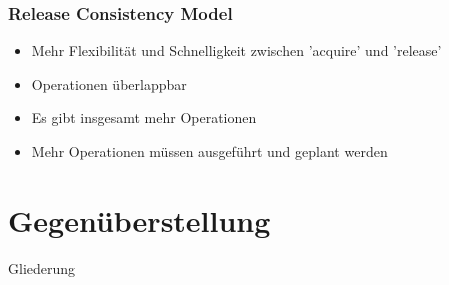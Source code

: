 \documentclass{sikslides}
\begin{document}
\begin{frame}
	\frametitle{Release Consistency Model}
	\begin{itemize}


		\item Mehr Flexibilität und Schnelligkeit zwischen ’acquire’ und ’release’ \bigskip
		\item Operationen überlappbar \bigskip
\end{itemize}
\begin{itemize}
		\item Es gibt insgesamt mehr Operationen  \bigskip
		\item Mehr Operationen müssen ausgeführt und geplant werden 

		

	\end{itemize}


\end{frame}



\section{Gegenüberstellung}
\begin{frame}{Gliederung}
   
    	\tableofcontents[currentsection, subsectionstyle=show/show/hide]
\end{frame}
\end{document}
